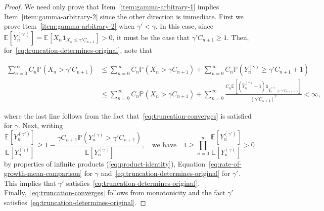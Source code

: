 \documentclass[12pt]{article}
\theoremstyle{definition}
\newcommand{\E}[2][]{\ensuremath{\mathbb{E}_{#1}\left[#2 \right]}}
\newcommand{\Prob}[2][]{\ensuremath{\mathbb{P}_{#1} \left(#2 \right)}}
\begin{document}
\begin{proof}
    We need only prove that Item~\ref{item:gamma-arbitrary-1} implies Item~\ref{item:gamma-arbitrary-2} since the other direction is immediate. First we prove Item~\ref{item:gamma-arbitrary-2} when $\gamma' < \gamma$. In this case, since $\E{Y^{(\gamma')}_{n}} = \E{X_{n}\mathbf{1}_{X_{n} \leq \gamma'C_{n+1}}} > 0$, it must be the case that $\gamma'C_{n+1} \geq 1$. Then, for~\eqref{eq:truncation-determines-original}, note that 
    \begin{linenomath}
    \begin{align*}
    \sum_{n=0}^{\infty} C_{n} \Prob{X_{n} > \gamma' C_{n+1}} & \leq \sum_{n=0}^{\infty} C_{n} \Prob{X_{n} > \gamma C_{n+1}} + \sum_{n=0}^{\infty} C_{n} \Prob{Y^{(\gamma)}_{n} \geq \gamma' C_{n+1} + 1}
    \\ & \leq \sum_{n=0}^{\infty} C_{n} \Prob{X_{n} > \gamma C_{n+1}} + \sum_{n=0}^{\infty} \frac{C_{n}\E{\left(\widehat{Y}^{(\gamma)}_{n} - 1\right)\mathbf{1}_{\widehat{Y}^{(\gamma)}_{n} \geq \gamma'C_{n+1} + 1}}}{(\gamma'C_{n+1})^2} < \infty, 
    \end{align*}
\end{linenomath}
where the last line follows from the fact that~\eqref{eq:truncation-converges} is satisfied for $\gamma$. Next, writing 
\begin{equation} \label{eq:means-inf-product}
\frac{\E{Y^{(\gamma')}_{n}}}{\E{Y^{(\gamma
)}_{n}}} \geq 1 - \frac{\gamma C_{n+1} \Prob{Y^{(\gamma)}_{n} > \gamma' C_{n+1}}}{\E{Y^{(\gamma)}_{n}}}, \quad \text{we have} \quad 1 \geq \prod_{n=0}^{\infty} \frac{\E{Y^{(\gamma')}_{n}}}{\E{Y^{(\gamma
)}_{n}}} > 0 
\end{equation}
by properties of infinite products (\eqref{eq:product-identity}), Equation~\eqref{eq:rate-of-growth-mean-comparison} for $\gamma$ and~\eqref{eq:truncation-determines-original} for $\gamma'$. This implies that $\gamma'$ satisfies~\eqref{eq:truncation-determines-original}. Finally,~\eqref{eq:truncation-converges} follows from monotonicity and the fact $\gamma'$ satisfies~\eqref{eq:truncation-determines-original}.


\end{proof}
\end{document}
